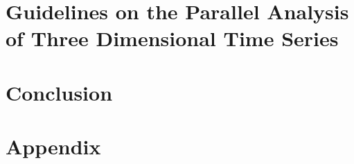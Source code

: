 \documentclass[10pt]{article}
\begin{document}
\section{Guidelines on the Parallel Analysis of Three Dimensional Time Series}


\section{Conclusion}


\clearpage

\appendix
\section{Appendix}

%




\end{document}
